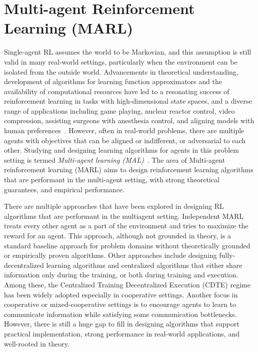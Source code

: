 \section{Multi-agent Reinforcement Learning (MARL)}\label{sec:marl}
Single-agent RL assumes the world to be Markovian, and this assumption is still valid in many
real-world settings, particularly when the environment can be isolated from the outside world.
Advancements in theoretical understanding, development of algorithms for learning function
approximators and the availability of computational resources have led to a resonating success of
reinforcement learning in tasks with high-dimensional state spaces, and a diverse range of
applications including game playing, nuclear reactor control, video compression, assisting surgeons
with anesthesia control, and aligning models with human preferences~.
However, often in real-world problems, there are multiple agents with objectives that can be
aligned or indifferent, or adversarial to each other.
Studying and designing learning algorithms for agents in this problem setting is termed
\textit{Multi-agent learning (MAL)}~\cite{tuylsMultiagent2012}.
The area of Multi-agent reinforcement learning (MARL) aims to design reinforcement learning
algorithms that are performant in the multi-agent setting, with strong theoretical guarantees, and
empirical performance.

There are multiple approaches that have been explored in designing RL algorithms that are
performant in the multiagent setting.
Independent MARL treats every other agent as a part of the environment and tries to maximize the
reward for an agent.
This approach, although not grounded in theory, is a standard baseline approach for problem domains
without theoretically grounded or empirically proven algorithms.
Other approaches include designing fully-decentralized learning algorithms and centralized
algorithms that either share information only during the training, or both during training and
execution.
Among these, the Centralized Training Decentralized Execution (CDTE) regime has been widely
adopted especially in cooperative settings.
Another focus in cooperative or mixed-cooperative settings is to encourage agents to learn to
communicate information while satisfying some communication bottlenecks.
However, there is still a huge gap to fill in designing algorithms that support practical
implementation, strong performance in real-world applications, and well-rooted in theory.

